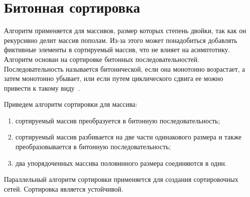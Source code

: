 \section{Битонная сортировка}

Алгоритм применяется для массивов, размер которых степень двойки, так как он рекурсивно делит массив пополам. Из-за этого может понадобиться добавлять фиктивные элементы в сортируемый массив, что не влияет на асимптотику. Алгоритм основан на сортировке битонных последовательностей. Последовательность называется битонической, если она монотонно возрастает, а затем монотонно убывает, или если путем циклического сдвига ее можно привести к такому виду~\cite{cormen}.

Приведем алгоритм сортировки для массива:
\begin{enumerate}
	\item сортируемый массив преобразуется в битонную последовательность;
	\item сортируемый массив разбивается на две части одинакового размера и также преобразовывается в битонную последовательность;
	\item два упорядоченных массива половинного размера соединяются в один.
\end{enumerate}
Параллельный алгоритм сортировки применяется для создания сортировочных сетей. Сортировка является устойчивой.
